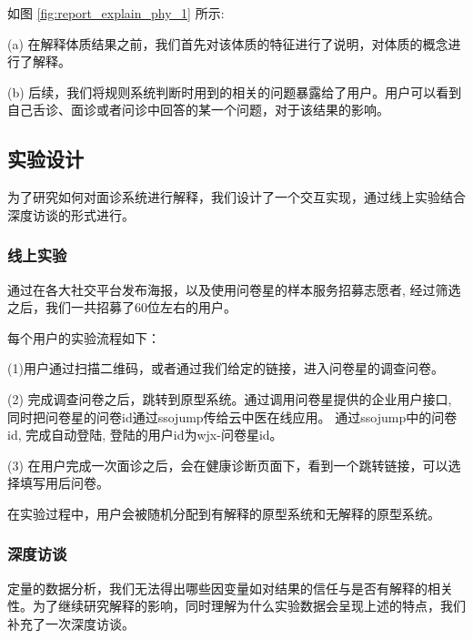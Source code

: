 如图 \ref{fig:report_explain_phy_1} 所示:

(a) 在解释体质结果之前，我们首先对该体质的特征进行了说明，对体质的概念进行了解释。

(b) 后续，我们将规则系统判断时用到的相关的问题暴露给了用户。用户可以看到自己舌诊、面诊或者问诊中回答的某一个问题，对于该结果的影响。


\subsection{实验设计}

为了研究如何对面诊系统进行解释，我们设计了一个交互实现，通过线上实验结合深度访谈的形式进行。

\subsubsection{线上实验}
通过在各大社交平台发布海报，以及使用问卷星的样本服务招募志愿者, 经过筛选之后，我们一共招募了60位左右的用户。

每个用户的实验流程如下：

(1)用户通过扫描二维码，或者通过我们给定的链接，进入问卷星的调查问卷。

(2) 完成调查问卷之后，跳转到原型系统。通过调用问卷星提供的企业用户接口, 同时把问卷星的问卷id通过ssojump传给云中医在线应用。
通过ssojump中的问卷id, 完成自动登陆, 登陆的用户id为wjx-{问卷星id}。

(3) 在用户完成一次面诊之后，会在健康诊断页面下，看到一个跳转链接，可以选择填写用后问卷。

在实验过程中，用户会被随机分配到有解释的原型系统和无解释的原型系统。

\subsubsection{深度访谈}

定量的数据分析，我们无法得出哪些因变量如对结果的信任与是否有解释的相关性。为了继续研究解释的影响，同时理解为什么实验数据会呈现上述的特点，我们补充了一次深度访谈。

